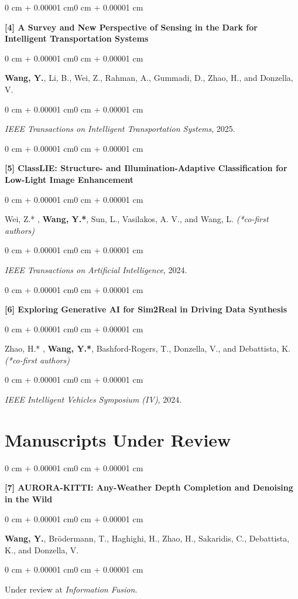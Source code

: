 \documentclass[10pt, letterpaper]{article}
\newenvironment{onecolentry}{
    \begin{adjustwidth}{0 cm + 0.00001 cm}{0 cm + 0.00001 cm}
}{
    \end{adjustwidth}
}
\begin{document}
\begin{onecolentry}
    \textbf{[4] A Survey and New Perspective of Sensing in the Dark for Intelligent Transportation Systems}
\end{onecolentry}
\begin{onecolentry}
    \textbf{Wang, Y.}, Li, B., Wei, Z., Rahman, A., Gummadi, D., Zhao, H., and Donzella, V.
\end{onecolentry}
\begin{onecolentry}
    \textit{IEEE Transactions on Intelligent Transportation Systems}, 2025.
\end{onecolentry}

\vspace{0.18cm}

\begin{onecolentry}
    \textbf{[5] ClassLIE: Structure- and Illumination-Adaptive Classification for Low-Light Image Enhancement}
\end{onecolentry}
\begin{onecolentry}
    Wei, Z.* , \textbf{Wang, Y.*}, Sun, L., Vasilakos, A. V., and Wang, L. \textit{(*co-first authors)}
\end{onecolentry}
\begin{onecolentry}
    \textit{IEEE Transactions on Artificial Intelligence}, 2024.
\end{onecolentry}

\vspace{0.18cm}

\begin{onecolentry}
    \textbf{[6] Exploring Generative AI for Sim2Real in Driving Data Synthesis}
\end{onecolentry}
\begin{onecolentry}
    Zhao, H.* , \textbf{Wang, Y.*}, Bashford-Rogers, T., Donzella, V., and Debattista, K. \textit{(*co-first authors)}
\end{onecolentry}
\begin{onecolentry}
    \textit{IEEE Intelligent Vehicles Symposium (IV)}, 2024.
\end{onecolentry}

\section{Manuscripts Under Review}

\begin{onecolentry}
    \textbf{[7] AURORA-KITTI: Any-Weather Depth Completion and Denoising in the Wild}
\end{onecolentry}
\begin{onecolentry}
    \textbf{Wang, Y.}, Br\"odermann, T., Haghighi, H., Zhao, H., Sakaridis, C., Debattista, K., and Donzella, V.
\end{onecolentry}
\begin{onecolentry}
    Under review at \textit{Information Fusion}.
\end{onecolentry}
\end{document}
